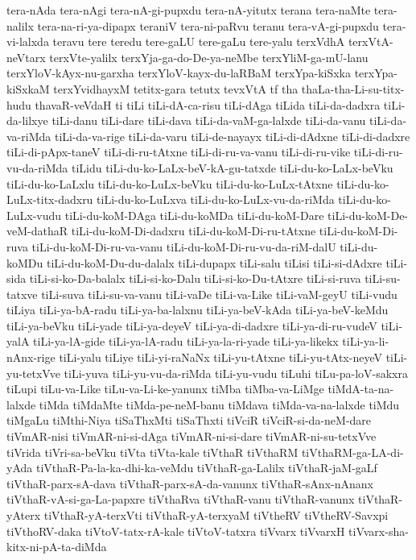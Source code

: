 {tera-nAda
tera-nAgi
tera-nA-gi-pupxdu
tera-nA-yitutx
terana
tera-naMte
tera-nalilx
tera-na-ri-ya-dipapx
teraniV
tera-ni-paRvu
teranu
tera-vA-gi-pupxdu
tera-vi-lalxda
teravu
tere
teredu
tere-gaLU
tere-gaLu
tere-yalu
terxVdhA
terxVtA-neVtarx
terxVte-yalilx
terxYja-ga-do-De-ya-neMbe
terxYliM-ga-mU-lanu
terxYloV-kAyx-nu-garxha
terxYloV-kayx-du-laRBaM
terxYpa-kiSxka
terxYpa-kiSxkaM
terxYvidhayxM
tetitx-gara
tetutx
tevxVtA
tf
tha
thaLa-tha-Li-su-titx-hudu
thavaR-veVdaH
ti
tiLi
tiLi-dA-ca-risu
tiLi-dAga
tiLida
tiLi-da-dadxra
tiLi-da-lilxye
tiLi-danu
tiLi-dare
tiLi-dava
tiLi-da-vaM-ga-lalxde
tiLi-da-vanu
tiLi-da-va-riMda
tiLi-da-va-rige
tiLi-da-varu
tiLi-de-nayayx
tiLi-di-dAdxne
tiLi-di-dadxre
tiLi-di-pApx-taneV
tiLi-di-ru-tAtxne
tiLi-di-ru-va-vanu
tiLi-di-ru-vike
tiLi-di-ru-vu-da-riMda
tiLidu
tiLi-du-ko-LaLx-beV-kA-gu-tatxde
tiLi-du-ko-LaLx-beVku
tiLi-du-ko-LaLxlu
tiLi-du-ko-LuLx-beVku
tiLi-du-ko-LuLx-tAtxne
tiLi-du-ko-LuLx-titx-dadxru
tiLi-du-ko-LuLxva
tiLi-du-ko-LuLx-vu-da-riMda
tiLi-du-ko-LuLx-vudu
tiLi-du-koM-DAga
tiLi-du-koMDa
tiLi-du-koM-Dare
tiLi-du-koM-De-veM-dathaR
tiLi-du-koM-Di-dadxru
tiLi-du-koM-Di-ru-tAtxne
tiLi-du-koM-Di-ruva
tiLi-du-koM-Di-ru-va-vanu
tiLi-du-koM-Di-ru-vu-da-riM-dalU
tiLi-du-koMDu
tiLi-du-koM-Du-du-dalalx
tiLi-dupapx
tiLi-salu
tiLisi
tiLi-si-dAdxre
tiLi-sida
tiLi-si-ko-Da-balalx
tiLi-si-ko-Dalu
tiLi-si-ko-Du-tAtxre
tiLi-si-ruva
tiLi-su-tatxve
tiLi-suva
tiLi-su-va-vanu
tiLi-vaDe
tiLi-va-Like
tiLi-vaM-geyU
tiLi-vudu
tiLiya
tiLi-ya-bA-radu
tiLi-ya-ba-lalxnu
tiLi-ya-beV-kAda
tiLi-ya-beV-keMdu
tiLi-ya-beVku
tiLi-yade
tiLi-ya-deyeV
tiLi-ya-di-dadxre
tiLi-ya-di-ru-vudeV
tiLi-yalA
tiLi-ya-lA-gide
tiLi-ya-lA-radu
tiLi-ya-la-ri-yade
tiLi-ya-likekx
tiLi-ya-li-nAnx-rige
tiLi-yalu
tiLiye
tiLi-yi-raNaNx
tiLi-yu-tAtxne
tiLi-yu-tAtx-neyeV
tiLi-yu-tetxVve
tiLi-yuva
tiLi-yu-vu-da-riMda
tiLi-yu-vudu
tiLuhi
tiLu-pa-loV-sakxra
tiLupi
tiLu-va-Like
tiLu-va-Li-ke-yanunx
tiMba
tiMba-va-LiMge
tiMdA-ta-na-lalxde
tiMda
tiMdaMte
tiMda-pe-neM-banu
tiMdava
tiMda-va-na-lalxde
tiMdu
tiMgaLu
tiMthi-Niya
tiSaThxMti
tiSaThxti
tiVciR
tiVciR-si-da-neM-dare
tiVmAR-nisi
tiVmAR-ni-si-dAga
tiVmAR-ni-si-dare
tiVmAR-ni-su-tetxVve
tiVrida
tiVri-sa-beVku
tiVta
tiVta-kale
tiVthaR
tiVthaRM
tiVthaRM-ga-LA-di-yAda
tiVthaR-Pa-la-ka-dhi-ka-veMdu
tiVthaR-ga-Lalilx
tiVthaR-jaM-gaLf
tiVthaR-parx-sA-dava
tiVthaR-parx-sA-da-vanunx
tiVthaR-sAnx-nAnanx
tiVthaR-vA-si-ga-La-papxre
tiVthaRva
tiVthaR-vanu
tiVthaR-vanunx
tiVthaR-yAterx
tiVthaR-yA-terxVti
tiVthaR-yA-terxyaM
tiVtheRV
tiVtheRV-Savxpi
tiVthoRV-daka
tiVtoV-tatx-rA-kale
tiVtoV-tatxra
tiVvarx
tiVvarxH
tiVvarx-sha-kitx-ni-pA-ta-diMda
}
